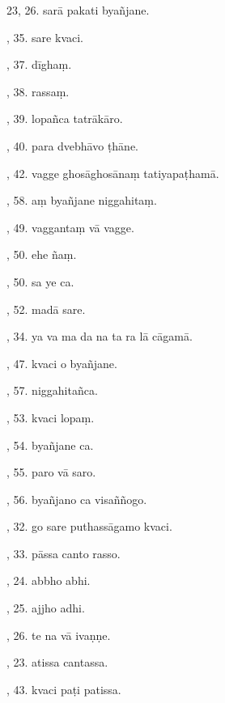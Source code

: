23, 26. sarā pakati byañjane.\hfill \pageref{sut:23}\par {}, 35. sare kvaci.\hfill \pageref{sut:24}\par {}, 37. dīghaṃ.\hfill \pageref{sut:25}\par {}, 38. rassaṃ.\hfill \pageref{sut:26}\par {}, 39. lopañca tatrākāro.\hfill \pageref{sut:27}\par {}, 40. para dvebhāvo ṭhāne.\hfill \pageref{sut:28}\par {}, 42. vagge ghosāghosānaṃ tatiyapaṭhamā.\hfill \pageref{sut:29}\par {}, 58. aṃ byañjane niggahitaṃ.\hfill \pageref{sut:30}\par {}, 49. vaggantaṃ vā vagge.\hfill \pageref{sut:31}\par {}, 50. ehe ñaṃ.\hfill \pageref{sut:32}\par {}, 50. sa ye ca.\hfill \pageref{sut:33}\par {}, 52. madā sare.\hfill \pageref{sut:34}\par {}, 34. ya va ma da na ta ra lā cāgamā.\hfill \pageref{sut:35}\par {}, 47. kvaci o byañjane.\hfill \pageref{sut:36}\par {}, 57. niggahitañca.\hfill \pageref{sut:37}\par {}, 53. kvaci lopaṃ.\hfill \pageref{sut:38}\par {}, 54. byañjane ca.\hfill \pageref{sut:39}\par {}, 55. paro vā saro.\hfill \pageref{sut:40}\par {}, 56. byañjano ca visaññogo.\hfill \pageref{sut:41}\par {}, 32. go sare puthassāgamo kvaci.\hfill \pageref{sut:42}\par {}, 33. pāssa canto rasso.\hfill \pageref{sut:43}\par {}, 24. abbho abhi.\hfill \pageref{sut:44}\par {}, 25. ajjho adhi.\hfill \pageref{sut:45}\par {}, 26. te na vā ivaṇṇe.\hfill \pageref{sut:46}\par {}, 23. atissa cantassa.\hfill \pageref{sut:47}\par {}, 43. kvaci paṭi patissa.\hfill \pageref{sut:48}\par \noindent

